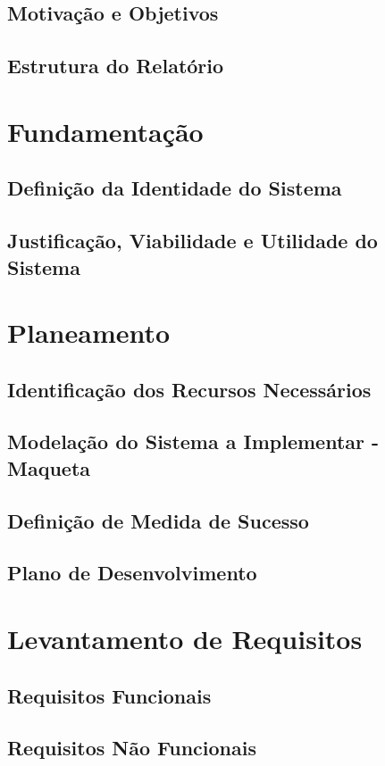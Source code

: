 \documentclass[a4paper]{report}
\begin{document}
    \section{Motivação e Objetivos}
    \section{Estrutura do Relatório}

\chapter{Fundamentação}
    \section{Definição da Identidade do Sistema}
    \section{Justificação, Viabilidade e Utilidade do Sistema}

\chapter{Planeamento}
    \section{Identificação dos Recursos Necessários}
    \section{Modelação do Sistema a Implementar - Maqueta}
    \section{Definição de Medida de Sucesso}
    \section{Plano de Desenvolvimento}

\chapter{Levantamento de Requisitos}
    \section{Requisitos Funcionais}
    \section{Requisitos Não Funcionais}
\end{document}
